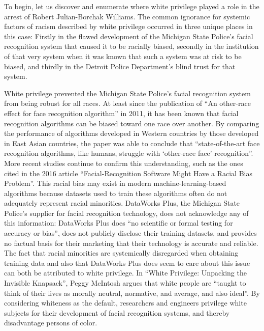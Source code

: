 \documentclass[12pt, letterpaper]{article}
\begin{document}
\begin{mla}
To begin, let us discover and enumerate where white privilege played a role in
the arrest of Robert Julian-Borchak Williams. The common ignorance for
systemic factors of racism described by white privilege occurred in three
unique places in this case: Firstly in the flawed development of the Michigan
State Police's facial recognition system that caused it to be racially biased,
secondly in the institution of that very system when it was known that such a
system was at risk to be biased, and thirdly in the Detroit Police
Department's blind trust for that system.

White privilege prevented the Michigan State Police's facial recognition
system from being robust for all races. At least since the publication of ``An
other-race effect for face recognition algorithm'' in 2011, it has been known
that facial recognition algorithms can be biased toward one race over another.
By comparing the performance of algorithms developed in Western countries by
those developed in East Asian countries, the paper was able to conclude that
``state-of-the-art face recognition algorithms, like humans, struggle with
`other-race face' recognition''. More recent studies continue to confirm this
understanding, such as the ones cited in the 2016 article ``Facial-Recognition
Software Might Have a Racial Bias Problem''. This racial bias may exist in
modern machine-learning-based algorithms because datasets used to train these
algorithms often do not adequately represent racial minorities. DataWorks
Plus, the Michigan State Police's supplier for facial recognition technology,
does not acknowledge any of this information: DataWorks Plus does ``no
scientific or formal testing for accuracy or bias'', does not publicly
disclose their training datasets, and provides no factual basis for their
marketing that their technology is accurate and reliable. The fact that racial
minorities are systemically disregarded when obtaining training data and also
that DataWorks Plus does seem to care about this issue can both be
attributed to white privilege. In ``White Privilege: Unpacking the Invisible
Knapsack'', Peggy McIntosh argues that white people are ``taught to think of
their lives as morally neutral, normative, and average, and also ideal''. By
considering whiteness as the default, researchers and engineers privilege
white subjects for their development of facial recognition systems, and
thereby disadvantage persons of color.


\end{mla}
\end{document}
